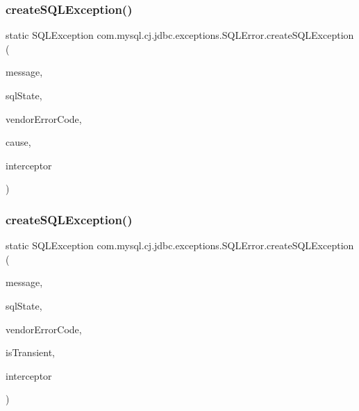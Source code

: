 \subsubsection{\texorpdfstring{create\+S\+Q\+L\+Exception()}{createSQLException()}\hspace{0.1cm}{\footnotesize\ttfamily [5/7]}}
{\footnotesize\ttfamily static S\+Q\+L\+Exception com.\+mysql.\+cj.\+jdbc.\+exceptions.\+S\+Q\+L\+Error.\+create\+S\+Q\+L\+Exception (\begin{DoxyParamCaption}\item[{String}]{message,  }\item[{String}]{sql\+State,  }\item[{int}]{vendor\+Error\+Code,  }\item[{Throwable}]{cause,  }\item[{\mbox{\hyperlink{interfacecom_1_1mysql_1_1cj_1_1exceptions_1_1_exception_interceptor}{Exception\+Interceptor}}}]{interceptor }\end{DoxyParamCaption})\hspace{0.3cm}{\ttfamily [static]}}

\mbox{\label{classcom_1_1mysql_1_1cj_1_1jdbc_1_1exceptions_1_1_s_q_l_error_afaec4b0c520a82a09774a4fc1e1c031c}} 
\subsubsection{\texorpdfstring{create\+S\+Q\+L\+Exception()}{createSQLException()}\hspace{0.1cm}{\footnotesize\ttfamily [6/7]}}
{\footnotesize\ttfamily static S\+Q\+L\+Exception com.\+mysql.\+cj.\+jdbc.\+exceptions.\+S\+Q\+L\+Error.\+create\+S\+Q\+L\+Exception (\begin{DoxyParamCaption}\item[{String}]{message,  }\item[{String}]{sql\+State,  }\item[{int}]{vendor\+Error\+Code,  }\item[{boolean}]{is\+Transient,  }\item[{\mbox{\hyperlink{interfacecom_1_1mysql_1_1cj_1_1exceptions_1_1_exception_interceptor}{Exception\+Interceptor}}}]{interceptor }\end{DoxyParamCaption})\hspace{0.3cm}{\ttfamily [static]}}

